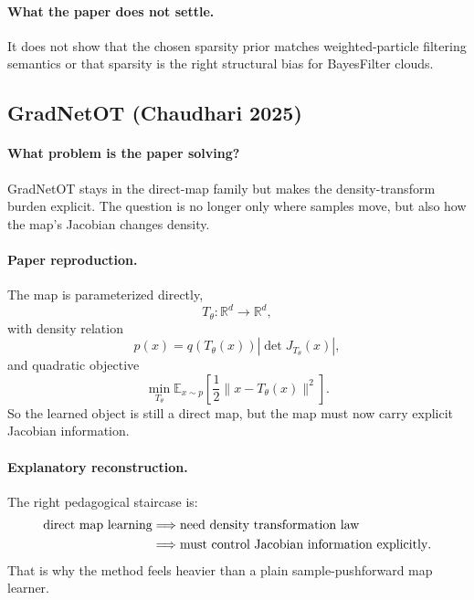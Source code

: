 \documentclass[11pt]{report}
\newcommand{\R}{\mathbb{R}}
\newcommand{\E}{\mathbb{E}}
\begin{document}
\paragraph{What the paper does not settle.}
It does not show that the chosen sparsity prior matches weighted-particle filtering
semantics or that sparsity is the right structural bias for BayesFilter clouds.

\subsection*{GradNetOT (Chaudhari 2025)}

\paragraph{What problem is the paper solving?}
GradNetOT stays in the direct-map family but makes the density-transform burden
explicit.  The question is no longer only where samples move, but also how the map's
Jacobian changes density.

\paragraph{Paper reproduction.}
The map is parameterized directly,
\begin{equation}
T_\theta : \R^d \to \R^d,
\label{eq:gradnet-map}
\end{equation}
with density relation
\begin{equation}
p(x)=q(T_\theta(x))\left|\det J_{T_\theta}(x)\right|,
\label{eq:gradnet-jacobian}
\end{equation}
and quadratic objective
\begin{equation}
\min_{T_\theta} \E_{x\sim p}\left[\frac12\|x-T_\theta(x)\|^2\right].
\label{eq:gradnet-ot}
\end{equation}
So the learned object is still a direct map, but the map must now carry explicit
Jacobian information.

\paragraph{Explanatory reconstruction.}
The right pedagogical staircase is:
\begin{align}
\text{direct map learning}
&\Longrightarrow
\text{need density transformation law}
\notag\\
&\Longrightarrow
\text{must control Jacobian information explicitly}.
\label{eq:gradnet-logic}
\end{align}
That is why the method feels heavier than a plain sample-pushforward map learner.
\end{document}
